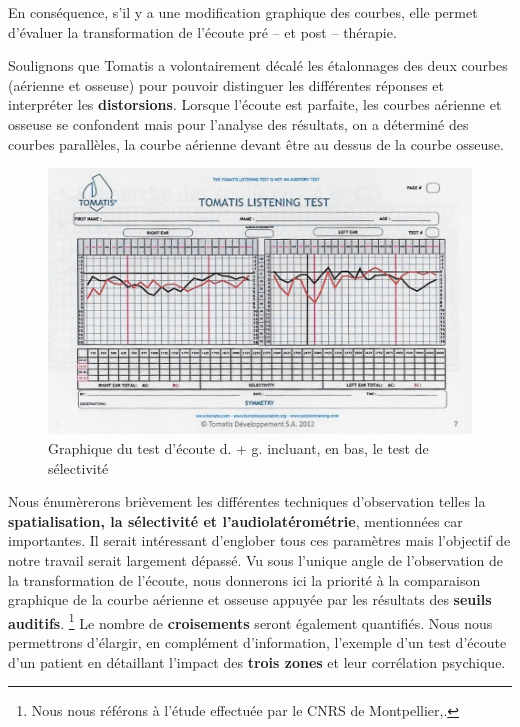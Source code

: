  En  conséquence,  s'il y a une modification
          graphique des courbes, elle 
          permet d'évaluer la transformation de l'écoute pré -- et
          post -- thérapie.
          

 
 
Soulignons que Tomatis a volontairement décalé les étalonnages des deux courbes (aérienne
	et osseuse) pour pouvoir distinguer les différentes réponses et interpréter
	les \textbf{distorsions}. Lorsque l'écoute est parfaite, les
	courbes aérienne et osseuse se confondent mais pour l'analyse des
	résultats, on a déterminé des courbes parallèles, la courbe aérienne
	devant être au dessus de la courbe osseuse.


\begin{figure}
	\centering
	\includegraphics[width=0.7\linewidth]{images/tomatisListeningTest.jpg}
	\caption[Graphique du test d'écoute]{Graphique du test
          d'écoute d. + g. incluant, en bas, le test de sélectivité}
	\label{fig:tomatislisteningtest}
\end{figure}



Nous énumèrerons brièvement les
différentes techniques d'observation telles la
\textbf{spatialisation, la
sélectivité et l'audiolatérométrie}, mentionnées car importantes.
 Il serait intéressant d'englober tous ces paramètres mais
  l'objectif de notre travail serait largement dépassé.
Vu sous l'unique angle de l'observation de la transformation de l'écoute, nous
donnerons ici la priorité à la comparaison graphique  
de la courbe aérienne et osseuse appuyée par les résultats
des \textbf{seuils auditifs}.
\footnote{Nous nous référons à  
  l'étude effectuée par le CNRS de Montpellier,\autocite{affectiveDisorders}.}
Le nombre de \textbf{croisements }seront
également quantifiés.
Nous nous permettrons d'élargir, en
complément d'information, l'exemple d'un test d'écoute d'un patient en détaillant l'impact
des\textbf{ trois zones} et leur corrélation psychique.



